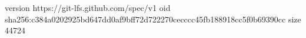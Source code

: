 version https://git-lfs.github.com/spec/v1
oid sha256:c384a0202925bd647dd0af9bff72d722270cecccc45fb188918cc5f0b69390cc
size 44724
